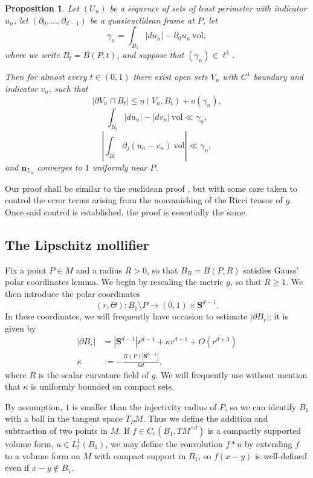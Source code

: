 \documentclass[reqno,12pt,letterpaper]{amsart}
\newcommand{\Sph}{\mathbf S}
\newcommand{\normal}{\mathbf n}
\newcommand{\vol}{\mathrm{vol}}
\newtheorem{proposition}[theorem]{Proposition}
\theoremstyle{definition}
\numberwithin{equation}{section}
\begin{document}
\begin{proposition}\label{mollifier proposition}
Let $(U_n)$ be a sequence of sets of least perimeter with indicator $u_n$, let $(\partial_0, \dots, \partial_{d - 1})$ be a quasieuclidean frame at $P$, let
$$\gamma_n = \int_{B_1} |du_n| - \partial_0u_n ~\vol,$$
where we write $B_t = B(P, t)$, and suppose that $(\gamma_n) \in \ell^1$.

Then for almost every $t \in (0, 1)$ there exist open sets $V_n$ with $C^1$ boundary and indicator $v_n$, such that
$$|\partial V_n \cap B_t| \leq \eta(V_n, B_t) + o(\gamma_n),$$
$$\int_{B_t} |du_n| - |dv_n| ~\vol \ll \gamma_n,$$
$$\left|\int_{B_t} \partial_j(u_n - v_n)~\vol\right| \ll \gamma_n,$$
and $\normal_{L_n}$ converges to $1$ uniformly near $P$.
\end{proposition}

Our proof shall be similar to the euclidean proof \cite[Lemma 5.5]{Miranda66}, but with some care taken to control the error terms arising from the nonvanishing of the Ricci tensor of $g$.
Once said control is established, the proof is essentially the same.


\subsection{The Lipschitz mollifier}
Fix a point $P \in M$ and a radius $R > 0$, so that $B_R = B(P, R)$ satisfies Gauss' polar coordinates lemma.
We begin by rescaling the metric $g$, so that $R \geq 1$.
We then introduce the polar coordinates
$$(r, \Theta): B_1 \setminus P \to (0, 1) \times \Sph^{d - 1}.$$
In these coordinates, we will frequently have occasion to estimate $|\partial B_r|$; it is given by
\begin{align}\label{area of sphere form}
|\partial B_r| &= |\Sph^{d - 1}|r^{d - 1} + \kappa r^{d + 1} + O(r^{d + 3})\\
\label{normalized scalar curvature}
\kappa &:= -\frac{R(P)|\Sph^{d - 1}|}{6d},
\end{align}
where $R$ is the scalar curvature field of $g$.
We will frequently use without mention that $\kappa$ is uniformly bounded on compact sets.

By assumption, $1$ is smaller than the injectivity radius of $P$, so we can identify $B_1$ with a ball in the tangent space $T_PM$.
Thus we define the addition and subtraction of two points in $M$.
If $f \in C_c(B_1, TM^{\wedge d})$ is a compactly supported volume form, $u \in L^1_l(B_1)$, we may define the convolution $f * u$ by extending $f$ to a volume form on $M$ with compact support in $B_1$, so $f(x - y)$ is well-defined even if $x - y \notin B_1$.
\end{document}
